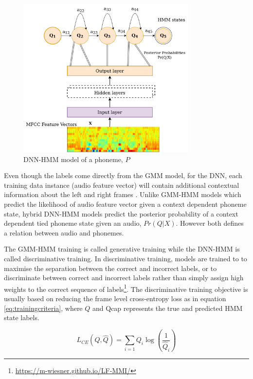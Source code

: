 \begin{figure}[htpb]
	\begin{center}
		\includegraphics[width=0.8\textwidth]{dnn-hmm.png}
		\caption{DNN-HMM model of a phoneme, $P$}
		\label{fig:dnn-hmm}
	\end{center}
\end{figure}

Even though the labels come directly from the GMM model, for the DNN, each
training data instance (audio feature vector) will contain additional contextual
information about the left and right frames \cite{meyer2019multi,yu2015deep}. Unlike
GMM-HMM models which predict the likelihood of audio feature vector given a context dependent phoneme state, hybrid
DNN-HMM models predict the posterior probability of a  context dependent tied phoneme state given an audio, $Pr(Q|X)$.
However both defines a relation between audio and phonemes. 

The GMM-HMM training is called generative training while the DNN-HMM is called
discriminative training. In discriminative training, models are trained to to
maximise the separation between the correct and incorrect labels, or to
discriminate between correct and incorrect labels rather than simply assign
high weights to the correct sequence of
labels\footnote{\url{https://m-wiesner.github.io/LF-MMI/}}. The discriminative training objective is usually based on reducing the frame level cross-entropy loss as in equation \ref{eq:trainingcriteria}, where ${Q}$ and \gls{Qcap} represents the true and predicted HMM state labels.

\begin{equation}
    \label{eq:trainingcriteria}
	L_{CE}(Q,\widehat{Q}) = \sum_{i=1} Q_i \log(\frac{1}{\widehat{Q}_i})
\end{equation}

